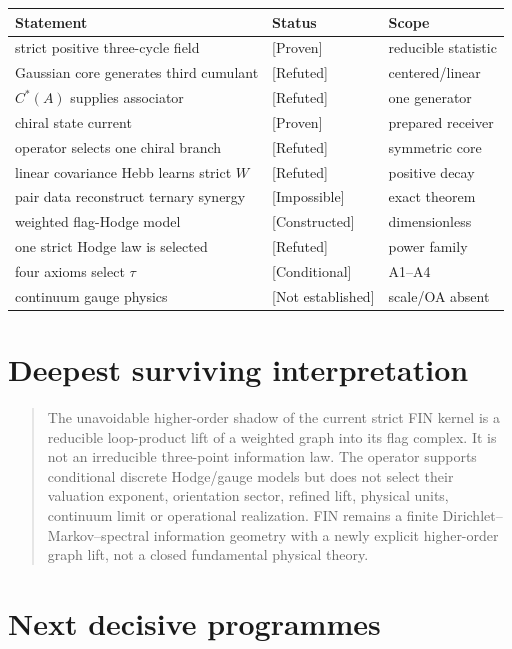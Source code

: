 \documentclass[11pt,a4paper]{article}
\newcommand{\status}[1]{\textsf{[#1]}}
\begin{document}
\begin{longtable}{@{}p{}p{}p{}@{}}
\toprule
Statement & Status & Scope \\
\midrule\endhead
strict positive three-cycle field & \status{Proven} & reducible statistic \\
Gaussian core generates third cumulant & \status{Refuted} & centered/linear \\
\(C^*(A)\) supplies associator & \status{Refuted} & one generator \\
chiral state current & \status{Proven} & prepared receiver \\
operator selects one chiral branch & \status{Refuted} & symmetric core \\
linear covariance Hebb learns strict \(W\) & \status{Refuted} & positive decay \\
pair data reconstruct ternary synergy & \status{Impossible} & exact theorem \\
weighted flag-Hodge model & \status{Constructed} & dimensionless \\
one strict Hodge law is selected & \status{Refuted} & power family \\
four axioms select \(\tau\) & \status{Conditional} & A1--A4 \\
continuum gauge physics & \status{Not established} & scale/OA absent \\
\bottomrule
\end{longtable}

\section{Deepest surviving interpretation}

\begin{quote}
The unavoidable higher-order shadow of the current strict FIN kernel is a
reducible loop-product lift of a weighted graph into its flag complex.  It is
not an irreducible three-point information law.  The operator supports
conditional discrete Hodge/gauge models but does not select their valuation
exponent, orientation sector, refined lift, physical units, continuum limit
or operational realization.  FIN remains a finite
Dirichlet--Markov--spectral information geometry with a newly explicit
higher-order graph lift, not a closed fundamental physical theory.
\end{quote}

\section{Next decisive programmes}
\end{document}
